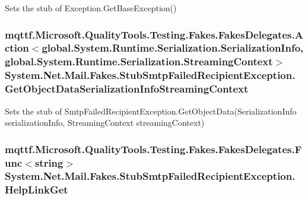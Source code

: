 Sets the stub of Exception.\-Get\-Base\-Exception()

\hypertarget{class_system_1_1_net_1_1_mail_1_1_fakes_1_1_stub_smtp_failed_recipient_exception_a22b7c171b7902b6c99efcc64d764c6ec}{
\subsubsection[{Get\-Object\-Data\-Serialization\-Info\-Streaming\-Context}]{\setlength{\rightskip}{0pt plus 5cm}mqttf.\-Microsoft.\-Quality\-Tools.\-Testing.\-Fakes.\-Fakes\-Delegates.\-Action$<$global.\-System.\-Runtime.\-Serialization.\-Serialization\-Info, global.\-System.\-Runtime.\-Serialization.\-Streaming\-Context$>$ System.\-Net.\-Mail.\-Fakes.\-Stub\-Smtp\-Failed\-Recipient\-Exception.\-Get\-Object\-Data\-Serialization\-Info\-Streaming\-Context}}\label{class_system_1_1_net_1_1_mail_1_1_fakes_1_1_stub_smtp_failed_recipient_exception_a22b7c171b7902b6c99efcc64d764c6ec}


Sets the stub of Smtp\-Failed\-Recipient\-Exception.\-Get\-Object\-Data(\-Serialization\-Info serialization\-Info, Streaming\-Context streaming\-Context)

\hypertarget{class_system_1_1_net_1_1_mail_1_1_fakes_1_1_stub_smtp_failed_recipient_exception_aa97486b17f9a8734bf59334000ddd693}{
\subsubsection[{Help\-Link\-Get}]{\setlength{\rightskip}{0pt plus 5cm}mqttf.\-Microsoft.\-Quality\-Tools.\-Testing.\-Fakes.\-Fakes\-Delegates.\-Func$<$string$>$ System.\-Net.\-Mail.\-Fakes.\-Stub\-Smtp\-Failed\-Recipient\-Exception.\-Help\-Link\-Get}}\label{class_system_1_1_net_1_1_mail_1_1_fakes_1_1_stub_smtp_failed_recipient_exception_aa97486b17f9a8734bf59334000ddd693}


